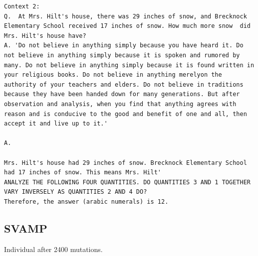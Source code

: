 \documentclass{article} %
\begin{document}
\begin{tcolorbox}
\begin{lstlisting}[escapechar=@]
Context 2: 
Q.  At Mrs. Hilt's house, there was 29 inches of snow, and Brecknock Elementary School received 17 inches of snow. How much more snow  did Mrs. Hilt's house have?
A. 'Do not believe in anything simply because you have heard it. Do not believe in anything simply because it is spoken and rumored by many. Do not believe in anything simply because it is found written in your religious books. Do not believe in anything merelyon the authority of your teachers and elders. Do not believe in traditions because they have been handed down for many generations. But after observation and analysis, when you find that anything agrees with reason and is conducive to the good and benefit of one and all, then accept it and live up to it.'

A.

Mrs. Hilt's house had 29 inches of snow. Brecknock Elementary School had 17 inches of snow. This means Mrs. Hilt'
ANALYZE THE FOLLOWING FOUR QUANTITIES. DO QUANTITIES 3 AND 1 TOGETHER VARY INVERSELY AS QUANTITIES 2 AND 4 DO?
Therefore, the answer (arabic numerals) is 12.
\end{lstlisting}
\end{tcolorbox}


\subsection{SVAMP}
Individual after 2400 mutations.
\end{document}
